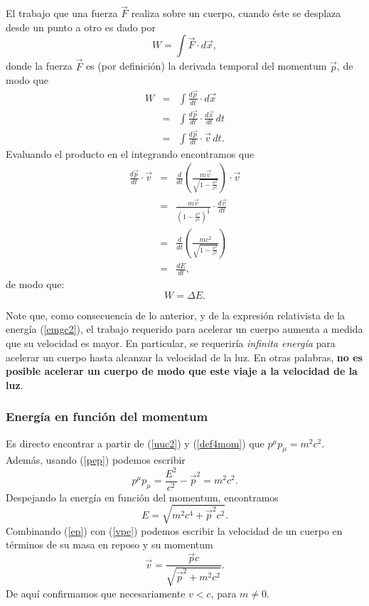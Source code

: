 El trabajo que una fuerza $\vec{F}$ realiza sobre un cuerpo, cuando éste se desplaza desde un punto a otro es dado por
\begin{equation}
W=\int\vec{F} \cdot d\vec{x},
\end{equation}
donde la fuerza $\vec{F}$ es (por definición) la derivada temporal del momentum $\vec{p}$, de modo
que
\begin{eqnarray}
W&=&\int\frac{d\vec{p}}{dt} \cdot d\vec{x}\\
&=&\int\frac{d\vec{p}}{dt} \cdot \frac{d\vec{x}}{dt}\,dt\\
&=&\int\frac{d\vec{p}}{dt} \cdot \vec{v}\,dt.
\end{eqnarray}
Evaluando el producto en el integrando encontramos que
\begin{eqnarray}
\frac{d\vec{p}}{dt} \cdot
\vec{v}&=&\frac{d}{dt}(\frac{m\vec{v}}{\sqrt{1-\frac{v^2}{c^2}}})\cdot
\vec{v}\\
&=&\frac{m\vec{v}}{(1-\frac{v^2}{c^2})^{\frac{3}{2}}}\cdot
\frac{d\vec{v}}{dt}\\
&=&\frac{d}{dt}(\frac{mc^2}{\sqrt{1-\frac{v^2}{c^2}}}) \\
&=&\frac{dE}{dt},
\end{eqnarray}
de modo que:
\begin{equation}
\boxed{W=\Delta E.}
\end{equation}

Note que, como consecuencia de lo anterior, y de la expresión relativista de la energía (\ref{emgc2}), el trabajo requerido para acelerar un cuerpo aumenta a medida que su velocidad es mayor. En particular, se requeriría \textit{infinita energía} para acelerar un cuerpo hasta alcanzar la velocidad de la luz. En otras palabras, \textbf{no es posible acelerar un cuerpo de modo que este viaje a la velocidad de la luz}.

\subsubsection{Energía en función del momentum}

Es directo encontrar a partir de (\ref{uuc2}) y (\ref{def4mom}) que $p^\mu
p_\mu=m^2c^2$. Además, usando (\ref{pep}) podemos escribir
\begin{equation}
p^\mu p_\mu =\frac{E^2}{c^2}-\vec{p}^2=m^2c^2.
\end{equation}
Despejando la energía en función del momentum, encontramos
\begin{equation}
\boxed{E=\sqrt{m^2c^4+\vec{p}^2c^2}.} \label{ep}
\end{equation}
Combinando (\ref{ep}) con (\ref{vpe}) podemos escribir la velocidad de un cuerpo en términos de su masa en reposo y su momentum
\begin{equation}
\vec{v}=\frac{\vec{p}c}{\sqrt{\vec{p}^2+m^2c^2}}. \label{vpp}
\end{equation}
De aquí confirmamos que necesariamente $v<c$, para $m\neq 0$.

